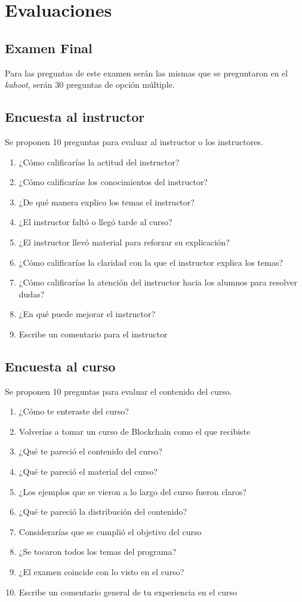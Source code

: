 \documentclass[a4paper,12pt]{lib/pub}
\begin{document}
\section{Evaluaciones}
\subsection{Examen Final}
Para las preguntas de este examen serán las mismas que se preguntaron en el \textit{kahoot}, serán 30 preguntas de opción múltiple.

\subsection{Encuesta al instructor}
Se proponen 10 preguntas para evaluar al instructor o los instructores.
\begin{enumerate}
	\item ¿Cómo calificarías la actitud del instructor?
	\item ¿Cómo calificarías los conocimientos del instructor?
	\item ¿De qué manera explico los temas el instructor?
	\item ¿El instructor faltó o llegó tarde al curso?
	\item ¿El instructor llevó material  para reforzar su explicación?
	\item ¿Cómo calificarías la claridad con la que el instructor explica los temas?
	\item ¿Cómo calificarías la atención del instructor hacia los alumnos para resolver dudas?
	\item ¿En qué puede mejorar el instructor?
	\item Escribe un comentario para el instructor
\end{enumerate}

\subsection{Encuesta al curso}
Se proponen 10 preguntas para evaluar el contenido del curso.
\begin{enumerate}
	\item ¿Cómo te enteraste del curso?
	\item Volverías a tomar un curso de Blockchain como el que recibiste
	\item ¿Qué te pareció el contenido del curso?
	\item ¿Qué te pareció el material del curso?
	\item ¿Los ejemplos que se vieron a lo largo del curso fueron claros?
	\item ¿Qué te pareció la distribución del contenido?
	\item Considerarías que se cumplió el objetivo del curso
	\item ¿Se tocaron todos los temas del programa?
	\item ¿El examen coincide con lo visto en el curso?
	\item Escribe un comentario general de tu experiencia en el curso
\end{enumerate}
\end{document}
